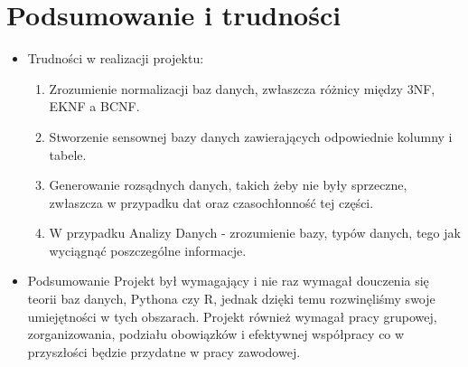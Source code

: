 \documentclass{article}
\begin{document}
\section{\LARGE Podsumowanie i trudności}
\begin{itemize}
    \item Trudności w realizacji projektu:
    \begin{enumerate}
        \item Zrozumienie normalizacji baz danych, zwłaszcza różnicy między 3NF, EKNF a BCNF.
        \item Stworzenie sensownej bazy danych zawierających odpowiednie kolumny i tabele.
        \item Generowanie rozsądnych danych, takich żeby nie były sprzeczne, zwłaszcza w przypadku dat oraz czasochłonność tej części.
        \item W przypadku Analizy Danych - zrozumienie bazy, typów danych, tego jak wyciągnąć poszczególne informacje.
    \end{enumerate}
    \item Podsumowanie \newline
    Projekt był wymagający i nie raz wymagał douczenia się teorii baz danych, Pythona czy R, jednak dzięki temu rozwinęliśmy swoje umiejętności w tych obszarach. Projekt również wymagał pracy grupowej, zorganizowania, podziału obowiązków i efektywnej współpracy co w przyszłości będzie przydatne w pracy zawodowej.
\end{itemize}
\end{document}
